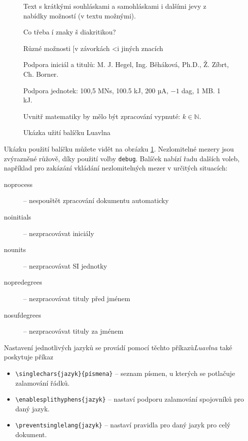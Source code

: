 \documentclass{csbulletin}
\newcommand\balicek[1]{\textit{#1}}
\begin{document}
\begin{figure}
  \begin{minipage}{3in}

    \preventsingledebugon

    Text s krátkými souhláskami a samohláskami i dalšími jevy
    z nabídky možností (v textu možnými).

    Co třeba í znaky š diakritikou?

    Různé možnosti [v závorkách \textless i jiných znacích

    Podpora iniciál a titulů: M. J. Hegel, Ing. Běháková, Ph.D., Ž. Zíbrt,
    Ch. Borner.

    Podpora jednotek: 100,5 MN\cdot{}s, 100.5 kJ, 200 µA, $-1$ dag, 1 MB. 1 kJ.

    Uvnitř matematiky by mělo být zpracování vypnuté: $k \in \mathbb N$.

    \preventsingledebugoff
  \end{minipage}
  \caption{Ukázka užití balíčku Luavlna}
  \label{fig:luavlna}
\end{figure}

Ukázku použití balíčku můžete vidět na obrázku \ref{fig:luavlna}. Nezlomitelné
mezery jsou zvýrazněné růžově, díky použití volby \texttt{debug}. Balíček
nabízí řadu dalších voleb, například pro zakázání vkládání nezlomitelných 
mezer v určitých situacích:

\begin{description}
  \item [noprocess] – nespouštět zpracování dokumentu automaticky
  \item [noinitials] – nezpracovávat iniciály
  \item [nounits] – nezpracovávat SI jednotky
  \item [nopredegrees] – nezpracovávat tituly před jménem
  \item [nosufdegrees] – nezpracovávat tituly za jménem
\end{description}

Nastavení jednotlivých jazyků se provádí pomocí těchto příkazů\balicek{Luavlna} také poskytuje příkaz

  \begin{itemize}
    \item\verb|\singlechars{jazyk}{písmena}| – seznam písmen, u kterých se potlačuje zalamování řádků.

    \item\verb|\enablesplithyphens{jazyk}| –  nastaví podporu zalamování spojovníků pro daný jazyk.
    \item\verb|\preventsinglelang{jazyk}| – nastaví pravidla pro daný jazyk pro celý dokument.
  \end{itemize}
\end{document}
